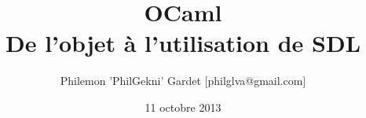 \documentclass[hideothersubsections]{beamer}
\title{OCaml \\ De l'objet à l'utilisation de SDL}
\author{Philemon 'PhilGekni' Gardet [philglva@gmail.com]}
\institute{\texttt{[image: pics/epita.png]}\\\texttt{[image: pics/gconfs.png]}}
\date{11 octobre 2013}
\begin{document}
	\begin{frame}
		\titlepage
	\end{frame}

	

	\begin{frame}
		\tableofcontents
	\end{frame}

	
	
	
	
	
	
	
\end{document}
